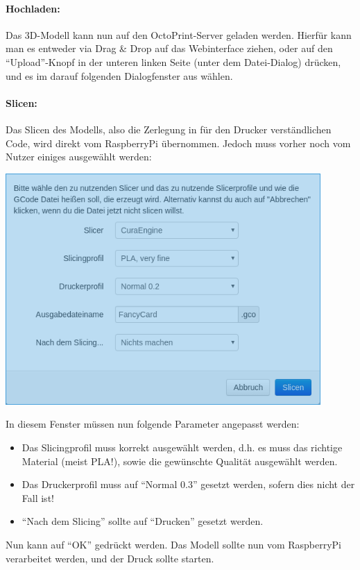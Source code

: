 \paragraph{Hochladen:} Das 3D-Modell kann nun auf den OctoPrint-Server geladen werden. Hierfür kann man es entweder via Drag \& Drop auf das Webinterface ziehen, oder auf den "`Upload"'-Knopf in der unteren linken Seite (unter dem Datei-Dialog) drücken, und es im darauf folgenden Dialogfenster aus wählen.

\paragraph{Slicen:} Das Slicen des Modells, also die Zerlegung in für den Drucker verständlichen Code, wird direkt vom RaspberryPi übernommen. Jedoch muss vorher noch vom Nutzer einiges ausgewählt werden:\\
\begin{center}
\includegraphics[width=0.9\textwidth]{Bilder/OPSliceWindow.png}
\end{center}
In diesem Fenster müssen nun folgende Parameter angepasst werden:
\begin{itemize}[noitemsep]
\item Das Slicingprofil muss korrekt ausgewählt werden, d.h. es muss das richtige Material (meist PLA!), sowie die gewünschte Qualität ausgewählt werden.
\item Das Druckerprofil muss auf "`Normal 0.3"' gesetzt werden, sofern dies nicht der Fall ist!
\item "`Nach dem Slicing"' sollte auf "`Drucken"' gesetzt werden.
\end{itemize}
Nun kann auf "`OK"' gedrückt werden. Das Modell sollte nun vom RaspberryPi verarbeitet werden, und der Druck sollte starten.


